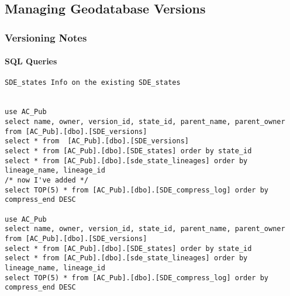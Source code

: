 \documentclass[class=article , crop=false, titlepage, twoside, multi={itemize, figure, verbatim}, float=false]{standalone}
\title{}  %
\begin{document}


\ifstandalone
\maketitle %
\tableofcontents %
\clearpage
\fi

\subsection{Managing Geodatabase Versions}
\medskip 
\subsubsection[Versioning Notes]{\Large Versioning Notes}


\paragraph{SQL Queries \texorpdfstring{\\}{}}
\begin{verbatim}
SDE_states Info on the existing SDE_states


use AC_Pub
select name, owner, version_id, state_id, parent_name, parent_owner from [AC_Pub].[dbo].[SDE_versions]
select * from  [AC_Pub].[dbo].[SDE_versions]
select * from [AC_Pub].[dbo].[SDE_states] order by state_id
select * from [AC_Pub].[dbo].[sde_state_lineages] order by lineage_name, lineage_id
/* now I've added */
select TOP(5) * from [AC_Pub].[dbo].[SDE_compress_log] order by compress_end DESC

use AC_Pub
select name, owner, version_id, state_id, parent_name, parent_owner from [AC_Pub].[dbo].[SDE_versions]
select * from [AC_Pub].[dbo].[SDE_states] order by state_id
select * from [AC_Pub].[dbo].[sde_state_lineages] order by lineage_name, lineage_id
select TOP(5) * from [AC_Pub].[dbo].[SDE_compress_log] order by compress_end DESC
\end{verbatim}
\end{document}
